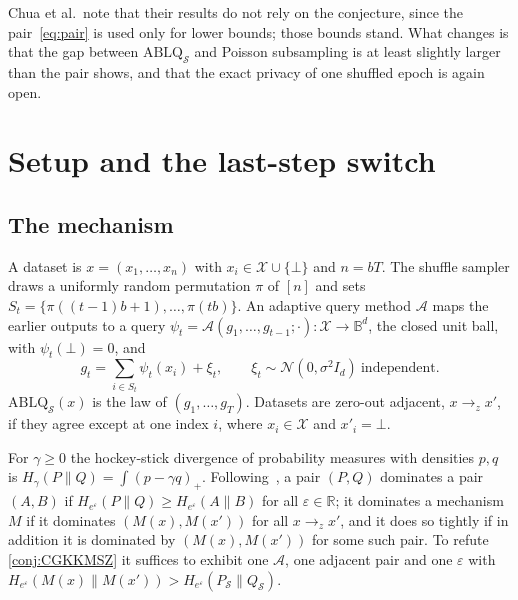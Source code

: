 \documentclass[11pt]{amsart}
\theoremstyle{definition}
\theoremstyle{remark}
\newcommand{\R}{\mathbb R}
\newcommand{\N}{\mathcal N}
\newcommand{\Ball}{\mathbb B}
\newcommand{\He}{H_{e^{\varepsilon}}}
\begin{document}
Chua et al.\ note that their results do not rely on the conjecture, since the pair~\eqref{eq:pair} is used only for lower bounds; those bounds stand. What changes is that the gap between $\mathrm{ABLQ}_{\mathcal S}$ and Poisson subsampling is at least slightly larger than the pair shows, and that the exact privacy of one shuffled epoch is again open.

\section{Setup and the last-step switch}\label{sec:setup}

\subsection{The mechanism}
A dataset is $x=(x_1,\dots,x_n)$ with $x_i\in\mathcal X\cup\{\bot\}$ and $n=bT$. The shuffle sampler draws a uniformly random permutation $\pi$ of $[n]$ and sets $S_t=\{\pi((t-1)b+1),\dots,\pi(tb)\}$. An adaptive query method $\mathcal A$ maps the earlier outputs to a query $\psi_t=\mathcal A(g_1,\dots,g_{t-1};\cdot)\colon\mathcal X\to\Ball^d$, the closed unit ball, with $\psi_t(\bot)=0$, and
\[
g_t=\sum_{i\in S_t}\psi_t(x_i)+\xi_t,\qquad \xi_t\sim\N(0,\sigma^2I_d)\ \text{independent}.
\]
$\mathrm{ABLQ}_{\mathcal S}(x)$ is the law of $(g_1,\dots,g_T)$. Datasets are zero-out adjacent, $x\to_z x'$, if they agree except at one index $i$, where $x_i\in\mathcal X$ and $x'_i=\bot$.

For $\gamma\ge0$ the hockey-stick divergence of probability measures with densities $p,q$ is $H_\gamma(P\|Q)=\int(p-\gamma q)_+$. Following~\cite[Definition~2.3]{CGKKMSZ24}, a pair $(P,Q)$ dominates a pair $(A,B)$ if $\He(P\|Q)\ge\He(A\|B)$ for all $\varepsilon\in\R$; it dominates a mechanism $M$ if it dominates $(M(x),M(x'))$ for all $x\to_z x'$, and it does so tightly if in addition it is dominated by $(M(x),M(x'))$ for some such pair. To refute \cref{conj:CGKKMSZ} it suffices to exhibit one $\mathcal A$, one adjacent pair and one $\varepsilon$ with $\He(M(x)\|M(x'))>\He(P_{\mathcal S}\|Q_{\mathcal S})$.
\end{document}
